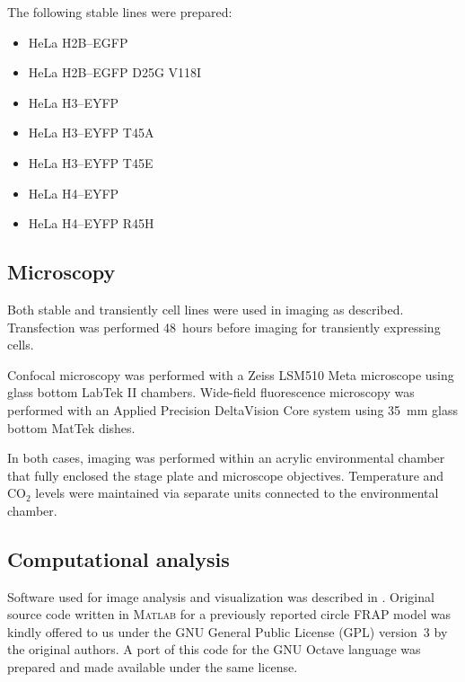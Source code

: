     The following stable lines were prepared:

    \begin{itemize}
      \item HeLa H2B--EGFP
      \item HeLa H2B--EGFP D25G V118I
      \item HeLa H3--EYFP
      \item HeLa H3--EYFP T45A
      \item HeLa H3--EYFP T45E
      \item HeLa H4--EYFP
      \item HeLa H4--EYFP R45H
    \end{itemize}

  \subsection{Microscopy}

    Both stable and transiently cell lines were used in imaging as described.
    Transfection was performed 48~hours before imaging for transiently
    expressing cells.

    Confocal microscopy was performed with a Zeiss LSM510 Meta microscope
    using glass bottom LabTek II chambers. Wide-field fluorescence microscopy
    was performed with an Applied Precision DeltaVision Core system
    using \SI{35}{\mm} glass bottom MatTek dishes.

    In both cases, imaging was performed within an acrylic environmental
    chamber that fully enclosed the stage plate and microscope objectives.
    Temperature and CO$_2$ levels were maintained via separate units connected
    to the environmental chamber.

  \subsection{Computational analysis}

    Software used for image analysis and visualization was described in
    . Original source code written in \textsc{Matlab} for a previously
    reported circle FRAP model \citep{mueller2008evidence} was kindly offered
    to us under the GNU General Public License (GPL) version~3 by the
    original authors. A port of this code for the GNU Octave language was
    prepared and made available under the same license.
